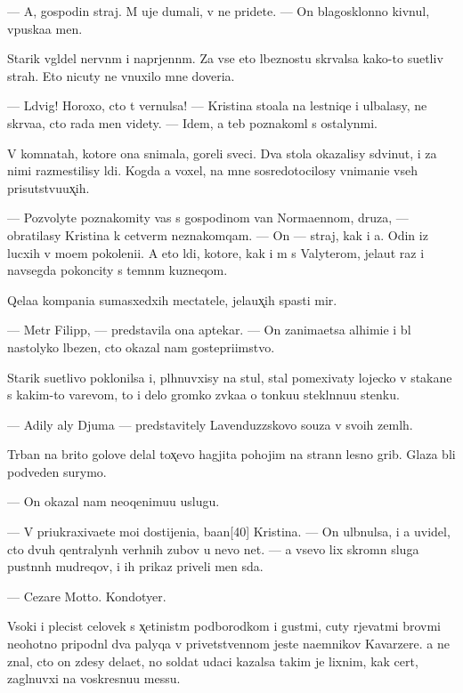 \documentclass[10pt]{book}
\begin{document}
— A, gospodin straj. M{\yi} uje dumali, v{\yi} ne pridete. — On blagosklonno kivnul, vpuska{\y}a men{\ia}.

Starik v{\yi}gl{\ia}del nervn{\yi}m i napr{\ia}jenn{\yi}m. Za vse{\y} eto{\y} l{\iu}beznost{\y}u skr{\yi}valsa kako{\y}-to su{\y}etliv{\yi}{\y} strah. Eto nicuty ne vnuxilo mne doveri{\y}a.

— L{\iu}dvig! Horoxo, cto t{\yi} vernulsa! — Kristina sto{\y}ala na lestniqe i ul{\yi}balasy, ne skr{\yi}va{\y}a, cto rada men{\ia} videty. — Idem, {\y}a teb{\ia} poznakoml{\iu} s ostalyn{\yi}mi.

V komnatah, kotor{\yi}{\y}e ona snimala, goreli sveci. Dva stola okazalisy sdvinut{\yi}, i za nimi razmestilisy l{\iu}di. Kogda {\y}a voxel, na mne sosredotocilosy vnimani{\y}e vseh prisutstvu{\y}ux̨ih.

— Pozvolyte poznakomity vas s gospodinom van Norma{\y}ennom, druz{\y}a, — obratilasy Kristina k cetver{\yi}m neznakomqam. — On — straj, kak i {\y}a. Odin iz lucxih v mo{\y}em pokoleni{\y}i. A eto l{\iu}di, kotor{\yi}{\y}e, kak i m{\yi} s Valyterom, jela{\y}ut raz i navsegda pokoncity s temn{\yi}m kuzneqom.

Qela{\y}a kompani{\y}a sumasxedxih mectatele{\y}, jela{\y}ux̨ih spasti mir.

— Metr Filipp, — predstavila ona aptekar{\ia}. — On zanima{\y}etsa alhimi{\y}e{\y} i b{\yi}l nastolyko l{\iu}bezen, cto okazal nam gostepri{\y}imstvo.

Starik su{\y}etlivo poklonilsa i, pl{\iu}hnuvxisy na stul, stal pomexivaty lojecko{\y} v stakane s kakim-to varevom, to i delo gromko zv{\ia}ka{\y}a o tonku{\y}u stekl{\ia}nnu{\y}u stenku.

— Adily aly Djuma — predstavitely Lavenduzzskovo so{\y}uza v svo{\y}ih zeml{\ia}h.

T{\iu}rban na brito{\y} golove delal tox̨evo hagjita pohojim na strann{\yi}{\y} lesno{\y} grib. Glaza b{\yi}li podveden{\yi} surymo{\y}.

— On okazal nam neoqenimu{\y}u uslugu.

— V{\yi} priukraxiva{\y}ete mo{\y}i dostijeni{\y}a, ba{\y}an[40] Kristina. — On ul{\yi}bnulsa, i {\y}a uvidel, cto dvuh qentralyn{\yi}h verhnih zubov u nevo net. — {\Y}a vsevo lix skromn{\yi}{\y} sluga pust{\yi}nn{\yi}h mudreqov, i ih prikaz{\yi} priveli men{\ia} s{\iu}da.

— Cezare Motto. Kondotyer.

V{\yi}soki{\y} i plecist{\yi}{\y} celovek s x̨etinist{\yi}m podborodkom i gust{\yi}mi, cuty r{\yi}jevat{\yi}mi brov{\ia}mi neohotno pripodn{\ia}l dva palyqa v privetstvennom jeste na{\y}emnikov Kavarzere. {\Y}a ne znal, cto on zdesy dela{\y}et, no soldat udaci kazalsa takim je lixnim, kak cert, zagl{\ia}nuvxi{\y} na voskresnu{\y}u messu.
\end{document}

